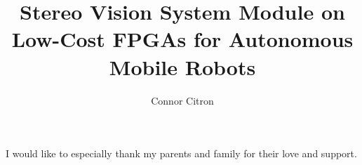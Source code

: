 \documentclass[12pt]{ucthesis}
\begin{document}

\title{Stereo Vision System Module on Low-Cost FPGAs for Autonomous Mobile Robots}
\author{Connor Citron}
  
 
     

\maketitle

\begin{frontmatter}

\copyrightpage

\committeemembershippage

\begin{abstract}



\end{abstract}

\begin{acknowledgements}

I would like to especially thank my parents and family for their love and support.

\end{acknowledgements}

\tableofcontents

\listoftables

\listoffigures

\end{frontmatter}

\pagestyle{plain}

\renewcommand{\baselinestretch}{1.66}




\end{document}
